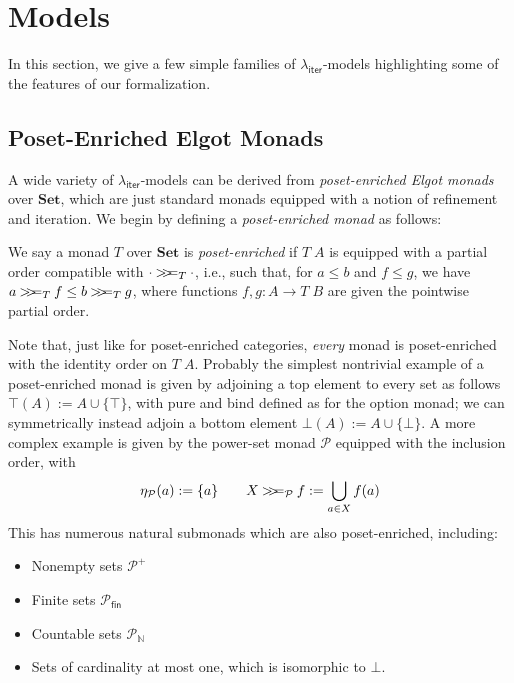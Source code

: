 \documentclass[acmsmall,screen,review]{acmart}
\newcommand{\mc}[1]{\ensuremath{\mathcal{#1}}}
\newcommand{\mb}[1]{\ensuremath{\mathbf{#1}}}
\newcommand{\ms}[1]{\ensuremath{\mathsf{#1}}}
\newcommand{\nats}{\mathbb{N}}
\newcommand{\subiterexp}{\texorpdfstring{\(\lambda_{\ms{iter}}\)}{lambda-iter}}
\newcommand{\obind}{\mathbin{>\!\!>\mkern-6.7mu=}}
\newcommand{\mbind}[3]{#2 \obind_{#1} #3}
\begin{document}
\section{Models}

\label{apx:models}

In this section, we give a few simple families of \subiterexp{}-models highlighting some of the
features of our formalization.

\subsection{Poset-Enriched Elgot Monads}

A wide variety of \subiterexp{}-models can be derived from \emph{poset-enriched Elgot monads} over
$\mb{Set}$, which are just standard monads equipped with a notion of refinement and iteration. We
begin by defining a \emph{poset-enriched monad} as follows:
\begin{definition}
  We say a monad $T$ over $\mb{Set}$ is \emph{poset-enriched} if $T\;A$ is equipped with a partial
  order compatible with $\mbind{T}{\cdot}{\cdot}$, i.e., such that, for $a \leq b$ and $f \leq g$,
  we have $\mbind{T}{a}{f} \leq \mbind{T}{b}{g}$, where functions $f, g : A \to T\;B$ are given the
  pointwise partial order.
\end{definition}
Note that, just like for poset-enriched categories, \emph{every} monad is poset-enriched with the
identity order on $T\;A$. Probably the simplest nontrivial example of a poset-enriched monad is
given by adjoining a top element to every set as follows $\top(A) := A \cup \{\top\}$, with pure and
bind defined as for the option monad; we can symmetrically instead adjoin a bottom element $\bot(A)
:= A \cup \{\bot\}$. A more complex example is given by the power-set monad $\mc{P}$ equipped with
the inclusion order, with
\begin{equation}
  \eta_{\mc{P}}(a) := \{a\} \qquad
  \mbind{\mc{P}}{X}{f} := \bigcup_{a \in X}f(a) 
\end{equation}
This has numerous natural submonads which are also poset-enriched, including:
\begin{itemize}
  \item Nonempty sets $\mc{P}^+$
  \item Finite sets $\mc{P}_{\ms{fin}}$
  \item Countable sets $\mc{P}_{\nats}$
  \item Sets of cardinality at most one, which is isomorphic to $\bot$.
\end{itemize}
\end{document}

